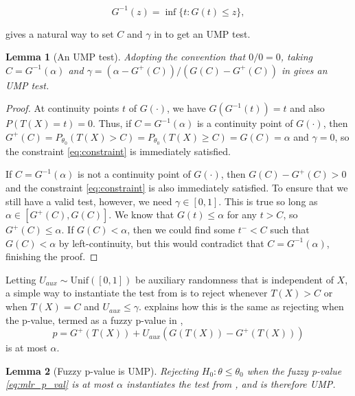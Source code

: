 \documentclass{article}
\newtheorem{lemma}{Lemma}
\begin{document}
\begin{appendix}
\begin{equation*}
    G^{-1}(z) = \inf \{ t : G(t) \leq z\},
\end{equation*}

 gives a natural way to set $C$ and $\gamma$ in  to get an UMP test. 

\begin{lemma}[An UMP test]
    \label{lem:setting_constants} Adopting the convention that $0/0 = 0$, taking $C = G^{-1}(\alpha)$ and $\gamma = (\alpha - G^+(C))/(G(C) - G^+(C))$
    in  gives an UMP test.
\end{lemma}

\begin{proof}
    At continuity points $t$ of $G(\cdot)$, we have $G(G^{-1}(t)) = t$ and also $P(T(X) = t) = 0$. Thus, if $C = G^{-1}(\alpha)$ is a continuity point of $G(\cdot)$, then $G^+(C) = P_{\theta_0}(T(X) > C) = P_{\theta_0}(T(X) \geq C) = G(C) = \alpha$ and $\gamma=0$, so the constraint \eqref{eq:constraint} is immediately satisfied. 

    If $C = G^{-1}(\alpha)$ is not a continuity point of $G(\cdot)$, then $G(C) - G^+(C) > 0$ and the constraint \eqref{eq:constraint} is also immediately satisfied. To ensure that we still have a valid test, however, we need $\gamma \in [0, 1]$. This is true so long as $\alpha \in [G^{+}(C), G(C)]$. We know that $G(t) \leq \alpha$ for any $t > C$, so $G^{+}(C) \leq \alpha$. If $G(C) < \alpha$, then we could find some $t^{-} < C$ such that $G(C) < \alpha$ by left-continuity, but this would contradict that $C = G^{-1}(\alpha)$, finishing the proof. 
\end{proof}

Letting $U_{aux} \sim \text{Unif}([0, 1])$ be auxiliary randomness that is independent of $X$, a simple way to instantiate the test from  is to reject whenever $T(X) > C$ or when $T(X) = C$ and $U_{aux} \leq \gamma$.  explains how this is the same as rejecting when the p-value, termed as a fuzzy p-value in \cite{Geyer}, 
\begin{equation}
    \label{eq:mlr_p_val}
    p = G^+(T(X)) + U_{aux}(G(T(X)) - G^+(T(X))) 
\end{equation}
is at most $\alpha$. 

\begin{lemma}[Fuzzy p-value is UMP]
    \label{lem:fuzzy}
    Rejecting $H_0: \theta \leq \theta_0$ when the fuzzy p-value \eqref{eq:mlr_p_val} is at most $\alpha$ instantiates the test from , and is therefore UMP. 
\end{lemma}


\end{appendix}
\end{document}

